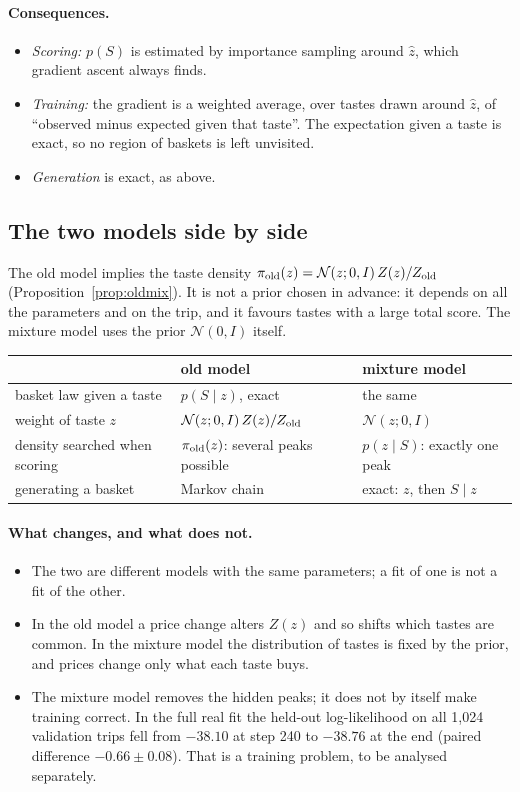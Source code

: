 \documentclass[11pt,a4paper]{article}
\newcommand{\N}{\mathcal N}
\begin{document}
\paragraph{Consequences.}
\begin{itemize}
\item \emph{Scoring:} $p(S)$ is estimated by importance sampling around $\hat z$, which gradient ascent always finds.
\item \emph{Training:} the gradient is a weighted average, over tastes drawn around $\hat z$, of ``observed minus
  expected given that taste''. The expectation given a taste is exact, so no region of baskets is left unvisited.
\item \emph{Generation} is exact, as above.
\end{itemize}

\subsection{The two models side by side}

The old model implies the taste density $\pi_{\rm old}(z)=\N(z;0,I)\,Z(z)/Z_{\rm old}$ (Proposition~\ref{prop:oldmix}). It is not a
prior chosen in advance: it depends on all the parameters and on the trip, and it favours tastes with a large total
score. The mixture model uses the prior $\N(0,I)$ itself.
\begin{center}\small
\begin{tabular}{lll}\toprule
 & old model & mixture model\\\midrule
basket law given a taste & $p(S\mid z)$, exact & the same\\
weight of taste $z$ & $\N(z;0,I)\,Z(z)/Z_{\rm old}$ & $\N(z;0,I)$\\
density searched when scoring & $\pi_{\rm old}(z)$: several peaks possible & $p(z\mid S)$: exactly one peak\\
generating a basket & Markov chain & exact: $z$, then $S\mid z$\\\bottomrule
\end{tabular}
\end{center}

\paragraph{What changes, and what does not.}
\begin{itemize}
\item The two are different models with the same parameters; a fit of one is not a fit of the other.
\item In the old model a price change alters $Z(z)$ and so shifts which tastes are common. In the mixture model the
  distribution of tastes is fixed by the prior, and prices change only what each taste buys.
\item The mixture model removes the hidden peaks; it does not by itself make training correct. In the full real fit
  the held-out log-likelihood on all 1{,}024 validation trips fell from $-38.10$ at step 240 to $-38.76$ at the end
  (paired difference $-0.66\pm0.08$). That is a training problem, to be analysed separately.
\end{itemize}
\end{document}
